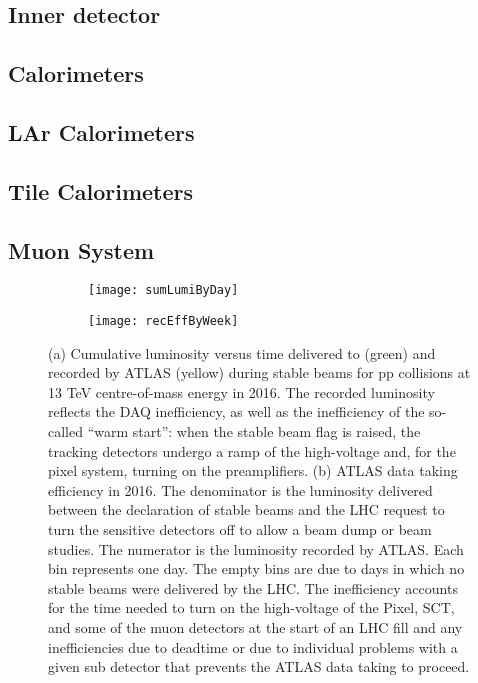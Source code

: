 \subsection{Inner detector}




\subsection{Calorimeters}

\subsection*{LAr Calorimeters}
\subsection*{Tile Calorimeters}


\subsection{Muon System}




\begin{figure}[t!]
\centering
\begin{subfigure}[t]{0.48\textwidth}
\texttt{[image: sumLumiByDay]}
\label{fig:exp.sumLumiByDay}
\end{subfigure}
\begin{subfigure}[t]{0.48\textwidth}
\texttt{[image: recEffByWeek]}
\label{fig:exp.recEffByWeek}
\end{subfigure}
\vspace{-0.25cm}
\caption{(a) Cumulative luminosity versus time delivered to (green) and recorded by ATLAS (yellow) during stable beams for pp collisions at 13 TeV centre-of-mass energy in 2016. 
The recorded luminosity reflects the DAQ inefficiency, as well as the inefficiency of the so-called ``warm start'': when the stable beam flag is raised, the tracking detectors undergo 
a ramp of the high-voltage and, for the pixel system, turning on the preamplifiers.
(b) ATLAS data taking efficiency in 2016. The denominator is the luminosity delivered between the declaration of stable beams and the LHC request to turn the sensitive detectors off to allow a beam dump or beam studies. The numerator is the luminosity recorded by ATLAS. Each bin represents one day. The empty bins are due to days in which no stable beams were delivered by the LHC. The inefficiency accounts for the time needed to turn on the high-voltage of the Pixel, SCT, and some of the muon detectors at the start of an LHC fill and any inefficiencies due to deadtime or due to individual problems with a given sub detector that prevents the ATLAS data taking to proceed. }
\label{fig:exp.atlas.datarec}
\end{figure} 




